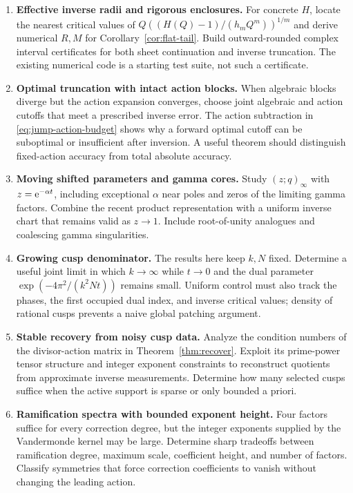 \documentclass[11pt,a4paper]{article}
\numberwithin{equation}{section}
\theoremstyle{definition}\newtheorem{definition}[theorem]{Definition}
\theoremstyle{remark}\newtheorem{remark}[theorem]{Remark}
\begin{document}
\begin{enumerate}[label=\textbf{R\arabic*.},leftmargin=14mm]
\item \textbf{Effective inverse radii and rigorous enclosures.}
For concrete $H$, locate the nearest critical values of
$Q((H(Q)-1)/(h_mQ^m))^{1/m}$ and derive numerical $R,M$ for
Corollary~\ref{cor:flat-tail}. Build outward-rounded complex interval
certificates for both sheet continuation and inverse truncation. The
existing numerical code is a starting test suite, not such a certificate.

\item \textbf{Optimal truncation with intact action blocks.}
When algebraic blocks diverge but the action expansion converges, choose
joint algebraic and action cutoffs that meet a prescribed inverse error.
The action subtraction in \eqref{eq:jump-action-budget} shows why a
forward optimal cutoff can be suboptimal or insufficient after inversion.
A useful theorem should distinguish fixed-action accuracy from total
absolute accuracy.

\item \textbf{Moving shifted parameters and gamma cores.}
Study $(z;q)_\infty$ with $z=\mathrm e^{-\alpha t}$, including exceptional
$\alpha$ near poles and zeros of the limiting gamma factors. Combine the
recent product representation \cite{ar} with a uniform inverse chart
that remains valid as $z\to1$. Include root-of-unity analogues and
coalescing gamma singularities.

\item \textbf{Growing cusp denominator.}
The results here keep $k,N$ fixed. Determine a useful joint limit in
which $k\to\infty$ while $t\to0$ and the dual parameter
$\exp(-4\pi^2/(k^2Nt))$ remains small. Uniform control must also track
the phases, the first occupied dual index, and inverse critical values;
density of rational cusps prevents a naive global patching argument.

\item \textbf{Stable recovery from noisy cusp data.}
Analyze the condition numbers of the divisor-action matrix in
Theorem~\ref{thm:recover}. Exploit its prime-power tensor structure and
integer exponent constraints to reconstruct quotients from approximate
inverse measurements. Determine how many selected cusps suffice when
the active support is sparse or only bounded a priori.

\item \textbf{Ramification spectra with bounded exponent height.}
Four factors suffice for every correction degree, but the integer
exponents supplied by the Vandermonde kernel may be large. Determine
sharp tradeoffs between ramification degree, maximum scale, coefficient
height, and number of factors. Classify symmetries that force correction
coefficients to vanish without changing the leading action.


\end{enumerate}
\end{document}
